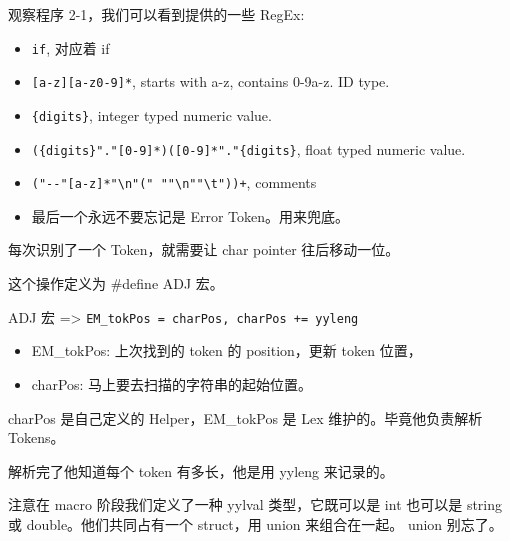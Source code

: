 \documentclass[
]{article}
\begin{document}
观察程序 2-1，我们可以看到提供的一些 RegEx:

\begin{itemize}
\item
  \texttt{if}, 对应着 if
\item
  \texttt{{[}a-z{]}{[}a-z0-9{]}*}, starts with a-z, contains 0-9a-z. ID
  type.
\item
  \texttt{\{digits\}}, integer typed numeric value.
\item
  \texttt{(\{digits\}"."{[}0-9{]}*)\textbar{}({[}0-9{]}*"."\{digits\}},
  float typed numeric value.
\item
  \texttt{("-\/-"{[}a-z{]}*"\textbackslash{}n"\textbar{}("\ "\textbar{}"\textbackslash{}n"\textbar{}"\textbackslash{}t"))+},
  comments
\item
  最后一个永远不要忘记是 Error Token。用来兜底。
\end{itemize}

每次识别了一个 Token，就需要让 char pointer 往后移动一位。

这个操作定义为 \#define ADJ 宏。

ADJ 宏 =\textgreater{}
\texttt{EM\_tokPos\ =\ charPos,\ charPos\ +=\ yyleng}

\begin{itemize}
\item
  EM\_tokPos: 上次找到的 token 的 position，更新 token 位置，
\item
  charPos: 马上要去扫描的字符串的起始位置。
\end{itemize}

charPos 是自己定义的 Helper，EM\_tokPos 是 Lex 维护的。毕竟他负责解析
Tokens。

解析完了他知道每个 token 有多长，他是用 yyleng 来记录的。

注意在 macro 阶段我们定义了一种 yylval 类型，它既可以是 int 也可以是
string 或 double。他们共同占有一个 struct，用 union 来组合在一起。 union
别忘了。
\end{document}
